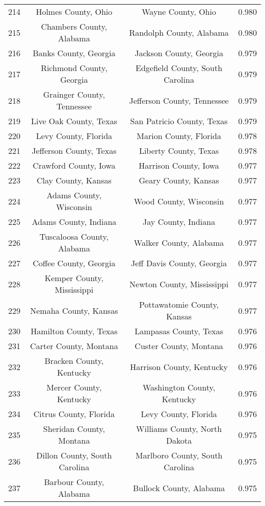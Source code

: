 \begin{longtable}{cccc}
  214 & Holmes County, Ohio & Wayne County, Ohio & 0.980 \\ 
  215 & Chambers County, Alabama & Randolph County, Alabama & 0.980 \\ 
  216 & Banks County, Georgia & Jackson County, Georgia & 0.979 \\ 
  217 & Richmond County, Georgia & Edgefield County, South Carolina & 0.979 \\ 
  218 & Grainger County, Tennessee & Jefferson County, Tennessee & 0.979 \\ 
  219 & Live Oak County, Texas & San Patricio County, Texas & 0.979 \\ 
  220 & Levy County, Florida & Marion County, Florida & 0.978 \\ 
  221 & Jefferson County, Texas & Liberty County, Texas & 0.978 \\ 
  222 & Crawford County, Iowa & Harrison County, Iowa & 0.977 \\ 
  223 & Clay County, Kansas & Geary County, Kansas & 0.977 \\ 
  224 & Adams County, Wisconsin & Wood County, Wisconsin & 0.977 \\ 
  225 & Adams County, Indiana & Jay County, Indiana & 0.977 \\ 
  226 & Tuscaloosa County, Alabama & Walker County, Alabama & 0.977 \\ 
  227 & Coffee County, Georgia & Jeff Davis County, Georgia & 0.977 \\ 
  228 & Kemper County, Mississippi & Newton County, Mississippi & 0.977 \\ 
  229 & Nemaha County, Kansas & Pottawatomie County, Kansas & 0.977 \\ 
  230 & Hamilton County, Texas & Lampasas County, Texas & 0.976 \\ 
  231 & Carter County, Montana & Custer County, Montana & 0.976 \\ 
  232 & Bracken County, Kentucky & Harrison County, Kentucky & 0.976 \\ 
  233 & Mercer County, Kentucky & Washington County, Kentucky & 0.976 \\ 
  234 & Citrus County, Florida & Levy County, Florida & 0.976 \\ 
  235 & Sheridan County, Montana & Williams County, North Dakota & 0.975 \\ 
  236 & Dillon County, South Carolina & Marlboro County, South Carolina & 0.975 \\ 
  237 & Barbour County, Alabama & Bullock County, Alabama & 0.975 \\ 

\end{longtable}
